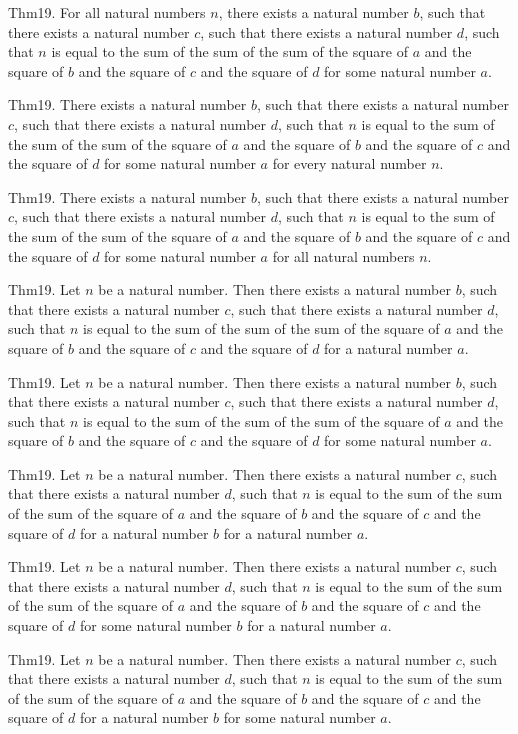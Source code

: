 \documentclass{article}
\begin{document}
Thm19. For all natural numbers $n$, there exists a natural number $b$, such that there exists a natural number $c$, such that there exists a natural number $d$, such that $n$ is equal to the sum of the sum of the sum of the square of $a$ and the square of $b$ and the square of $c$ and the square of $d$ for some natural number $a$.

Thm19. There exists a natural number $b$, such that there exists a natural number $c$, such that there exists a natural number $d$, such that $n$ is equal to the sum of the sum of the sum of the square of $a$ and the square of $b$ and the square of $c$ and the square of $d$ for some natural number $a$ for every natural number $n$.

Thm19. There exists a natural number $b$, such that there exists a natural number $c$, such that there exists a natural number $d$, such that $n$ is equal to the sum of the sum of the sum of the square of $a$ and the square of $b$ and the square of $c$ and the square of $d$ for some natural number $a$ for all natural numbers $n$.

Thm19. Let $n$ be a natural number. Then there exists a natural number $b$, such that there exists a natural number $c$, such that there exists a natural number $d$, such that $n$ is equal to the sum of the sum of the sum of the square of $a$ and the square of $b$ and the square of $c$ and the square of $d$ for a natural number $a$.

Thm19. Let $n$ be a natural number. Then there exists a natural number $b$, such that there exists a natural number $c$, such that there exists a natural number $d$, such that $n$ is equal to the sum of the sum of the sum of the square of $a$ and the square of $b$ and the square of $c$ and the square of $d$ for some natural number $a$.

Thm19. Let $n$ be a natural number. Then there exists a natural number $c$, such that there exists a natural number $d$, such that $n$ is equal to the sum of the sum of the sum of the square of $a$ and the square of $b$ and the square of $c$ and the square of $d$ for a natural number $b$ for a natural number $a$.

Thm19. Let $n$ be a natural number. Then there exists a natural number $c$, such that there exists a natural number $d$, such that $n$ is equal to the sum of the sum of the sum of the square of $a$ and the square of $b$ and the square of $c$ and the square of $d$ for some natural number $b$ for a natural number $a$.

Thm19. Let $n$ be a natural number. Then there exists a natural number $c$, such that there exists a natural number $d$, such that $n$ is equal to the sum of the sum of the sum of the square of $a$ and the square of $b$ and the square of $c$ and the square of $d$ for a natural number $b$ for some natural number $a$.
\end{document}
